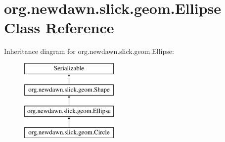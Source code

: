 \hypertarget{classorg_1_1newdawn_1_1slick_1_1geom_1_1_ellipse}{}\section{org.\+newdawn.\+slick.\+geom.\+Ellipse Class Reference}
\label{classorg_1_1newdawn_1_1slick_1_1geom_1_1_ellipse}
Inheritance diagram for org.\+newdawn.\+slick.\+geom.\+Ellipse\+:\begin{figure}[H]
\begin{center}
\leavevmode
\includegraphics[height=4.000000cm]{classorg_1_1newdawn_1_1slick_1_1geom_1_1_ellipse}
\end{center}
\end{figure}

